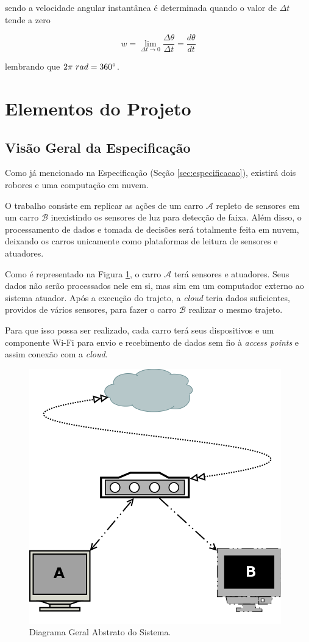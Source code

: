 \documentclass[portugues, brazil, a4paper,12pt]{article}
\begin{document}
		sendo a velocidade angular instantânea é determinada quando o valor de $\Delta t$ tende a zero

		\begin{equation}
			w = \lim_{\Delta t \to 0} \frac{\Delta \theta}{\Delta t} = \frac{d \theta}{d t}
		\end{equation}

		lembrando que $ 2 \pi\ rad = 360\degree$.


\section{Elementos do Projeto} \label{sec:elem-teo}

	\subsection{Visão Geral da Especificação}
		Como já mencionado na Especificação (Seção \ref{sec:especificacao}), existirá dois robores e uma computação em nuvem.

		O trabalho consiste em replicar as ações de um carro $ \mathcal{A} $ repleto de sensores em um carro $ \mathcal{B} $ inexistindo os sensores de luz para detecção de faixa. Além disso, o processamento de dados e tomada de decisões será totalmente feita em nuvem, deixando os carros unicamente como plataformas de leitura de sensores e atuadores.

		Como é representado na Figura \ref{fig:diagrama}, o carro $ \mathcal{A} $ terá sensores e atuadores. Seus dados não serão processados nele em si, mas sim em um computador externo ao sistema atuador. Após a execução do trajeto, a \textit{cloud} teria dados suficientes, providos de vários sensores, para fazer o carro $ \mathcal{B} $ realizar o mesmo trajeto.

		Para que isso possa ser realizado, cada carro terá seus dispositivos e um componente Wi-Fi para envio e recebimento de dados sem fio à \textit{access points} e assim conexão com a \textit{cloud}.

		\begin{figure}[h]
			\centering
			\includegraphics[width=0.5\linewidth]{img/diagrama_geral.png}
			\caption{Diagrama Geral Abstrato do Sistema.}
			\label{fig:diagrama}
		\end{figure}
\end{document}
